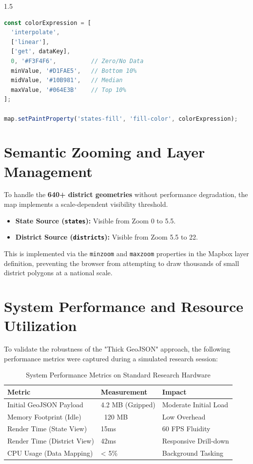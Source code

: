 \documentclass[12pt,a4paper]{report}
\begin{document}
\begin{spacing}{1.5}
\begin{lstlisting}[language=javascript, caption={Advanced Mapbox Expression for Normalized Color Scale}]
const colorExpression = [
  'interpolate',
  ['linear'],
  ['get', dataKey],
  0, '#F3F4F6',          // Zero/No Data
  minValue, '#D1FAE5',   // Bottom 10%
  midValue, '#10B981',   // Median
  maxValue, '#064E3B'    // Top 10%
];

map.setPaintProperty('states-fill', 'fill-color', colorExpression);
\end{lstlisting}

\section{Semantic Zooming and Layer Management}
To handle the \textbf{640+ district geometries} without performance degradation, the map implements a scale-dependent visibility threshold.
\begin{itemize}
    \item \textbf{State Source (\texttt{states}):} Visible from Zoom 0 to 5.5.
    \item \textbf{District Source (\texttt{districts}):} Visible from Zoom 5.5 to 22.
\end{itemize}
This is implemented via the \texttt{minzoom} and \texttt{maxzoom} properties in the Mapbox layer definition, preventing the browser from attempting to draw thousands of small district polygons at a national scale.

\section{System Performance and Resource Utilization}
To validate the robustness of the "Thick GeoJSON" approach, the following performance metrics were captured during a simulated research session:

\begin{table}[H]
\centering
\begin{tabular}{@{}lll@{}}
\toprule
\textbf{Metric} & \textbf{Measurement} & \textbf{Impact} \\ \midrule
Initial GeoJSON Payload & 4.2 MB (Gzipped) & Moderate Initial Load \\
Memory Footprint (Idle) & ~120 MB & Low Overhead \\
Render Time (State View) & 15ms & 60 FPS Fluidity \\
Render Time (District View) & 42ms & Responsive Drill-down \\
CPU Usage (Data Mapping) & < 5\% & Background Tasking \\ \bottomrule
\end{tabular}
\caption{System Performance Metrics on Standard Research Hardware}
\end{table}


\end{spacing}
\end{document}
